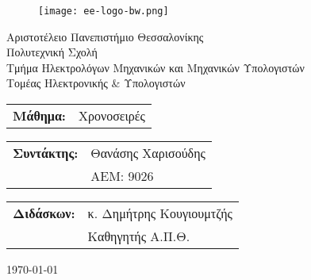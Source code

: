 \begin{titlepage}

\begin{figure}[H]
  \begin{center}
    \texttt{[image: ee-logo-bw.png]}
    \label{fig:cover_auth_logo}
  \end{center}
\end{figure}

\centering
\large Αριστοτέλειο Πανεπιστήμιο Θεσσαλονίκης\\
\large Πολυτεχνική Σχολή\\
\normalsize Τμήμα Ηλεκτρολόγων Μηχανικών και Μηχανικών Υπολογιστών\\
\normalsize Τομέας Ηλεκτρονικής \& Υπολογιστών

\vspace{\fill}

\Huge \textbf{\thesistitle}


\vspace{\fill}
\raggedright

\large
\begin{tabular}{ll}
\textbf{Μάθημα:} & Χρονοσειρές\\
\end{tabular}

\large
\begin{tabular}{ll}
\textbf{Συντάκτης:} & Θανάσης Χαρισούδης\\
                    & ΑΕΜ: 9026\\
\end{tabular}

\large
\begin{tabular}{ll}
\textbf{Διδάσκων:} & κ. Δημήτρης Κουγιουμτζής\\
                   & Καθηγητής Α.Π.Θ.\\
\end{tabular}

\centering
\vspace{\fill}
\normalsize \today

\end{titlepage}

\clearpage
